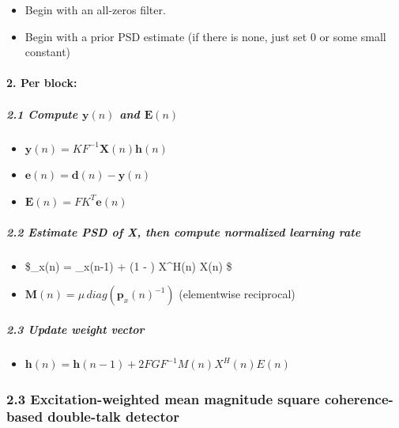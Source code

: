\documentclass[11pt]{article}
\providecommand{\tightlist}{%
      \setlength{\itemsep}{0pt}\setlength{\parskip}{0pt}}
\begin{document}
\begin{itemize}
\tightlist
\item
  Begin with an all-zeros filter.
\item
  Begin with a prior PSD estimate (if there is none, just set 0 or some
  small constant)
\end{itemize}

\hypertarget{per-block}{%
\paragraph{2. Per block:}\label{per-block}}

\hypertarget{compute-mathbfyn-and-mathbfen}{%
\subparagraph{\texorpdfstring{2.1 Compute \(\mathbf{y}(n)\) and
\(\mathbf{E}(n)\)}{2.1 Compute \textbackslash{}mathbf\{y\}(n) and \textbackslash{}mathbf\{E\}(n)}}\label{compute-mathbfyn-and-mathbfen}}

\begin{itemize}
\tightlist
\item
  \(\mathbf{y}(n) = K F^{-1} \mathbf{X}(n) \mathbf{h}(n)\)
\item
  \(\mathbf{e}(n) = \mathbf{d}(n) - \mathbf{y}(n)\)
\item
  \(\mathbf{E}(n) = F K^{T} \mathbf{e}(n)\)
\end{itemize}

\hypertarget{estimate-psd-of-x-then-compute-normalized-learning-rate}{%
\subparagraph{2.2 Estimate PSD of X, then compute normalized learning
rate}\label{estimate-psd-of-x-then-compute-normalized-learning-rate}}

\begin{itemize}
\tightlist
\item
  \$\_x(n) = \lambda {}\_x(n-1) + (1 - \lambda)
  X\^{}H(n) X(n) \$
\item
  \(\mathbf{M}(n) = \mu \, diag(\mathbf{p}_x(n)^{-1})\) (elementwise
  reciprocal)
\end{itemize}

\hypertarget{update-weight-vector}{%
\subparagraph{2.3 Update weight vector}\label{update-weight-vector}}

\begin{itemize}
\tightlist
\item
  \(\mathbf{h}(n) = \mathbf{h}(n-1) + 2 F G F^{-1} M(n) X^H(n)E(n)\)
\end{itemize}

\hypertarget{excitation-weighted-mean-magnitude-square-coherence-based-double-talk-detector}{%
\subsubsection{2.3 Excitation-weighted mean magnitude square
coherence-based double-talk
detector}\label{excitation-weighted-mean-magnitude-square-coherence-based-double-talk-detector}}
\end{document}
